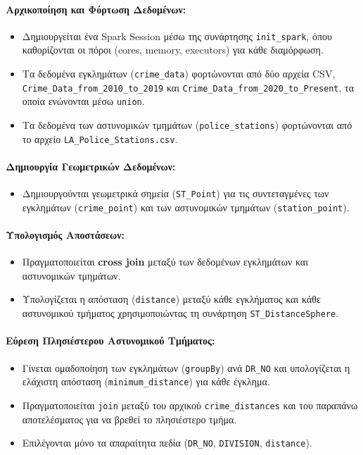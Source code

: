 \documentclass{article}
\begin{document}
\paragraph{Αρχικοποίηση και Φόρτωση Δεδομένων:}
\begin{itemize}
    \item Δημιουργείται ένα Spark Session μέσω της συνάρτησης \texttt{init\_spark}, όπου καθορίζονται οι πόροι (cores, memory, executors) για κάθε διαμόρφωση.
    \item Τα δεδομένα εγκλημάτων (\texttt{crime\_data}) φορτώνονται από δύο αρχεία CSV, \texttt{Crime\_Data\_from\_2010\_to\_2019} και \texttt{Crime\_Data\_from\_2020\_to\_Present}, τα οποία ενώνονται μέσω \texttt{union}.
    \item Τα δεδομένα των αστυνομικών τμημάτων (\texttt{police\_stations}) φορτώνονται από το αρχείο \texttt{LA\_Police\_Stations.csv}.
\end{itemize}

\paragraph{Δημιουργία Γεωμετρικών Δεδομένων:}
\begin{itemize}
    \item Δημιουργούνται γεωμετρικά σημεία (\texttt{ST\_Point}) για τις συντεταγμένες των εγκλημάτων (\texttt{crime\_point}) και των αστυνομικών τμημάτων (\texttt{station\_point}).
\end{itemize}

\paragraph{Υπολογισμός Αποστάσεων:}
\begin{itemize}
    \item Πραγματοποιείται \textbf{cross join} μεταξύ των δεδομένων εγκλημάτων και αστυνομικών τμημάτων.
    \item Υπολογίζεται η απόσταση (\texttt{distance}) μεταξύ κάθε εγκλήματος και κάθε αστυνομικού τμήματος χρησιμοποιώντας τη συνάρτηση \texttt{ST\_DistanceSphere}.
\end{itemize}

\paragraph{Εύρεση Πλησιέστερου Αστυνομικού Τμήματος:}
\begin{itemize}
    \item Γίνεται ομαδοποίηση των εγκλημάτων (\texttt{groupBy}) ανά \texttt{DR\_NO} και υπολογίζεται η ελάχιστη απόσταση (\texttt{minimum\_distance}) για κάθε έγκλημα.
    \item Πραγματοποιείται \texttt{join} μεταξύ του αρχικού \texttt{crime\_distances} και του παραπάνω αποτελέσματος για να βρεθεί το πλησιέστερο τμήμα.
    \item Επιλέγονται μόνο τα απαραίτητα πεδία (\texttt{DR\_NO}, \texttt{DIVISION}, \texttt{distance}).
\end{itemize}
\end{document}
